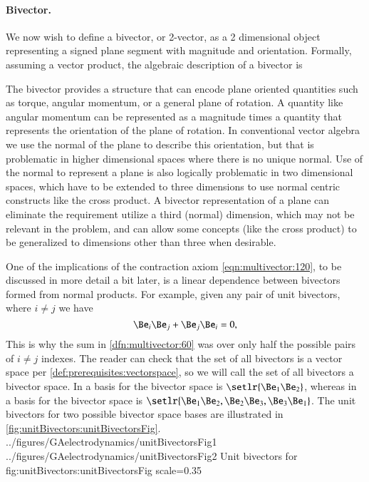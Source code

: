 \paragraph{Bivector.}

We now wish to define a bivector, or 2-vector, as a 2 dimensional object representing a signed plane segment with magnitude and orientation.  Formally,
assuming a vector product, the algebraic description of a bivector is


The bivector provides a structure that can encode plane oriented quantities such as torque, angular momentum, or a general plane of rotation.
A quantity like angular momentum can be represented as a magnitude times a quantity that represents the orientation of the plane of rotation.
In conventional vector algebra we use the normal of the plane to describe this orientation, but that is problematic in higher dimensional spaces where there is no unique normal.
Use of the normal to represent a plane is also logically problematic in two dimensional spaces, which have to be extended to three dimensions to use normal centric constructs like the cross product.
A bivector representation of a plane can eliminate the requirement utilize a third (normal) dimension, which may not be relevant in the problem, and can allow some concepts (like the cross product) to be generalized to dimensions other than three when desirable.

One of the implications of the contraction axiom \cref{eqn:multivector:120}, to be discussed in more detail a bit later, is a linear dependence between bivectors formed from normal products.  For example, given any pair of unit bivectors, where \( i \ne j \) we have
\begin{dmath}\label{eqn:multivector:140}
\Be_i \Be_j + \Be_j \Be_i = 0,
\end{dmath}
This is why the sum in \cref{dfn:multivector:60} was over only half the possible pairs of \( i \ne j \) indexes.
The reader can check that the set of all bivectors is a vector space per
\cref{def:prerequisites:vectorspace}, so we will call the set of all bivectors a bivector space.
In  a basis for the bivector space is \( \setlr{ \Be_1 \Be_2 } \), whereas in  a basis for the bivector space is
\( \setlr{ \Be_1 \Be_2, \Be_2 \Be_3, \Be_3 \Be_1 } \).  The unit bivectors for two possible  bivector space bases are illustrated in
\cref{fig:unitBivectors:unitBivectorsFig}.
\imageTwoFigures
{../figures/GAelectrodynamics/unitBivectorsFig1}
{../figures/GAelectrodynamics/unitBivectorsFig2}
{Unit bivectors for }
{fig:unitBivectors:unitBivectorsFig}
{scale=0.35}

